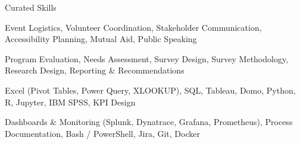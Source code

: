 
\begin{rubric}{Curated Skills}

Event Logistics, Volunteer Coordination, Stakeholder Communication, Accessibility Planning, Mutual Aid, Public Speaking

\vspace{0.3\baselineskip}
Program Evaluation, Needs Assessment, Survey Design, Survey Methodology, Research Design, Reporting \& Recommendations

\vspace{0.3\baselineskip}
Excel (Pivot Tables, Power Query, XLOOKUP), SQL, Tableau, Domo, Python, R, Jupyter, IBM SPSS, KPI Design

\vspace{0.3\baselineskip}
Dashboards \& Monitoring (Splunk, Dynatrace, Grafana, Prometheus), Process Documentation, Bash / PowerShell, Jira, Git, Docker

\end{rubric}